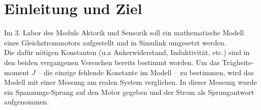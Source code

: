 \section{Einleitung und Ziel}

Im 3. Labor des Moduls Aktorik und Sensorik soll ein mathematische Modell
eines Gleichstrommotors aufgestellt und in Simulink umgesetzt werden.\\

Die dafür nötigen Konstanten (u.a Ankerwiderstand, Induktivität, etc.)
sind in den beiden vergangenen Versuchen bereits bestimmt worden.
Um das Trägheits-moment $J$ -- die einzige fehlende Konstante im Modell --
zu bestimmen, wird das Modell mit einer Messung am realen System
verglichen. In dieser Messung wurde ein Spannungs-Sprung auf den Motor
gegeben und der Strom als Sprungantwort aufgenommen.